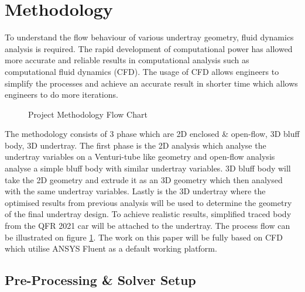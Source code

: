 \section{Methodology}
To understand the flow behaviour of various undertray geometry, fluid dynamics analysis is required. The rapid development of computational power has allowed more accurate and reliable results in computational analysis such as computational fluid dynamics (CFD)\cite{Andersson2011ComputationalEngineers}. The usage of CFD allows engineers to simplify the processes and achieve an accurate result in shorter time which allows engineers to do more iterations. 

\begin{figure}[!htb]
    \centering
    \caption{Project Methodology Flow Chart}
    \label{fig:project methodology}
\end{figure}

\noindent The methodology consists of 3 phase which are 2D enclosed \& open-flow, 3D bluff body, 3D undertray. The first phase is the 2D analysis which analyse the undertray variables on a Venturi-tube like geometry and open-flow analysis analyse a simple bluff body with similar undertray variables. 3D bluff body will take the 2D geometry and extrude it as an 3D geometry which then analysed with the same undertray variables. Lastly is the 3D undertray where the optimised results from previous analysis will be used to determine the geometry of the final undertray design. To achieve realistic results, simplified traced body from the QFR 2021 car will be attached to the undertray. The process flow can be illustrated on figure \ref{fig:project methodology}. The work on this paper will be fully based on CFD which utilise ANSYS Fluent as a default working platform.

\subsection{Pre-Processing \& Solver Setup}

